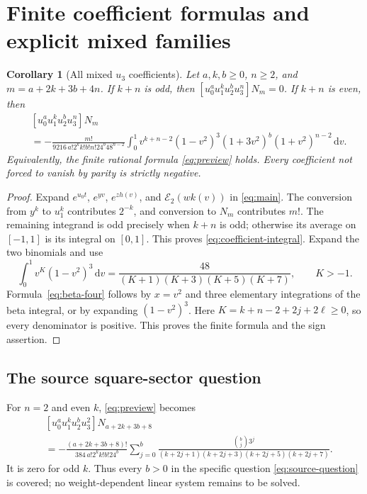 \documentclass[11pt]{article}
\numberwithin{equation}{section}
\newtheorem{corollary}[theorem]{Corollary}
\theoremstyle{definition}\newtheorem{definition}[theorem]{Definition}
\theoremstyle{remark}\newtheorem{remark}[theorem]{Remark}
\newcommand{\dd}{\,\mathrm d}
\newcommand{\Erem}{\mathcal E_2}
\begin{document}
\section{Finite coefficient formulas and explicit mixed families}
\label{sec:coefficients}

\begin{corollary}[All mixed $u_3$ coefficients]\label{cor:coefficients}
Let $a,k,b\ge0$, $n\ge2$, and $m=a+2k+3b+4n$. If $k+n$ is odd,
then $[u_0^au_1^ku_2^bu_3^n]N_m=0$. If $k+n$ is even, then
\begin{equation}\label{eq:coefficient-integral}
\begin{split}
 &[u_0^au_1^ku_2^bu_3^n]N_m\\
 &=-\frac{m!}{9216\,a!2^kk!b!n!24^b48^{n-2}}
 \int_0^1v^{k+n-2}(1-v^2)^3
       (1+3v^2)^b(1+v^2)^{n-2}\dd v.
\end{split}
\end{equation}
Equivalently, the finite rational formula \eqref{eq:preview} holds.
Every coefficient not forced to vanish by parity is strictly negative.
\end{corollary}
\begin{proof}
Expand $e^{u_0t}$, $e^{yv}$, $e^{zh(v)}$, and $\Erem(wk(v))$ in
\eqref{eq:main}. The conversion from $y^k$ to $u_1^k$ contributes
$2^{-k}$, and conversion to $N_m$ contributes $m!$. The remaining
integrand is odd precisely when $k+n$ is odd; otherwise its average on
$[-1,1]$ is its integral on $[0,1]$. This proves
\eqref{eq:coefficient-integral}. Expand the two binomials and use
\begin{equation}\label{eq:beta-four}
 \int_0^1v^K(1-v^2)^3\dd v
 =\frac{48}{(K+1)(K+3)(K+5)(K+7)},\qquad K>-1.
\end{equation}
Formula~\eqref{eq:beta-four} follows by $x=v^2$ and three elementary
integrations of the beta integral, or by expanding $(1-v^2)^3$.
Here $K=k+n-2+2j+2\ell\ge0$, so every denominator is positive.
This proves the finite formula and the sign assertion.
\end{proof}

\subsection{The source square-sector question}
For $n=2$ and even $k$, \eqref{eq:preview} becomes
\begin{equation}\label{eq:square-answer}
\boxed{\begin{aligned}
 &[u_0^au_1^ku_2^bu_3^2]N_{a+2k+3b+8}\\
 &=-\frac{(a+2k+3b+8)!}{384\,a!2^kk!b!24^b}
 \sum_{j=0}^b
 \frac{\binom bj3^j}
 {(k+2j+1)(k+2j+3)(k+2j+5)(k+2j+7)}.
\end{aligned}}
\end{equation}
It is zero for odd $k$. Thus every $b>0$ in the specific question
\eqref{eq:source-question} is covered; no weight-dependent linear
system remains to be solved.
\end{document}

